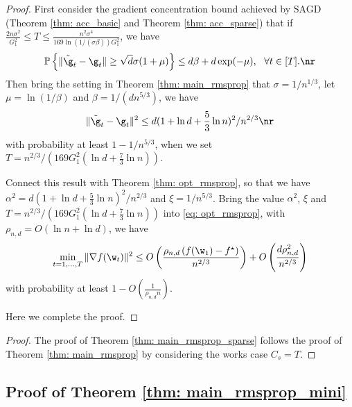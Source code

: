 \begin{proof}
First consider the gradient concentration bound achieved by SAGD (Theorem \ref{thm: acc_basic} and Theorem \ref{thm: acc_sparse}) that if $ \frac{2n\sigma^2}{G_1^2}\leq T \leq \frac{n^2 \sigma^4}{169 \ln(1/(\sigma \beta))G_1^2}$, we have 
\begin{equation}
\begin{split}
\mathbb{P}\left\{\|\tilde \g_t - \g_t\| \geq \sqrt{d}\sigma(1+\mu)\right\} \leq d\beta + d\exp(-\mu), \ \ \forall t \in [T].
\end{split} \nr
\end{equation}
Then bring the setting in Theorem \ref{thm: main_rmsprop} that $\sigma = 1/n^{1/3}$, let $\mu = \ln (1/\beta)$ and $\beta = 1/(d n^{5/3})$, we have
\begin{equation}
 \|\tilde \g_t - \g_t\|^2 \leq d(1+\ln d + \frac{5}{3}\ln n)^2/n^{2/3}    \nr
\end{equation}
with probability at least $1- 1/n^{5/3}$, when we set $T = n^{2/3}/\left(169G_1^2(\ln d + \frac{7}{3}\ln n)\right)$. 

Connect this result with Theorem \ref{thm: opt_rmsprop}, so that we have $\alpha^2 = d(1+\ln d + \frac{5}{3}\ln n)^2/n^{2/3}$ and $\xi = 1/n^{5/3}$. Bring the value $\alpha^2$, $\xi$ and $T = n^{2/3}/\left(169G_1^2(\ln d + \frac{7}{3}\ln n)\right)$ into \eqref{eq: opt_rmsprop}, with $\rho_{n,d} = O \left(\ln n + \ln d \right)$, we have
\begin{align*}
\min_{t = 1,..., T}\|\nabla f(\w_t)\|^2 \leq O\left( \frac{\rho_{n,d} \left(f(\w_1) - f^\star \right)}{n^{2/3}} \right) + O \left( \frac{d \rho_{n,d}^2}{n^{2/3}}\right)
\end{align*}
with probability at least $1-O\left(\frac{1}{\rho_{n,d} n}\right)$.

Here we complete the proof.

\end{proof}


\theormspropsparse*


\begin{proof}
The proof of 
Theorem \ref{thm: main_rmsprop_sparse} follows the proof of Theorem \ref{thm: main_rmsprop} by considering the works case $C_{s} = T$.
\end{proof}


\subsection{Proof of Theorem \ref{thm: main_rmsprop_mini}} 

